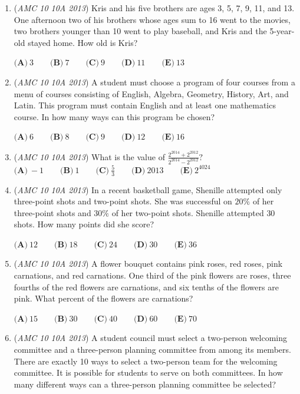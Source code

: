 \begin{enumerate}
 $\textbf{(A)}\ 15\qquad\textbf{(B)}\ 20\qquad\textbf{(C)}\ 25\qquad\textbf{(D)}\ 30\qquad\textbf{(E)}\ 35$


	\item (\textit{AMC 10 10A 2013}) Kris and his five brothers are ages 3, 5, 7, 9, 11, and 13.  One afternoon two of his brothers whose ages sum to 16 went to the movies, two brothers younger than 10 went to play baseball, and Kris and the 5-year-old stayed home.  How old is Kris?


 $\textbf{(A)}\ 3 \qquad\textbf{(B)}\ 7  \qquad\textbf{(C)}\ 9 \qquad\textbf{(D)}\ 11 \qquad\textbf{(E)}\ 13$


	\item (\textit{AMC 10 10A 2013}) A student must choose a program of four courses from a menu of courses consisting of English, Algebra, Geometry, History, Art, and Latin. This program must contain English and at least one mathematics course. In how many ways can this program be chosen?


 $\textbf{(A)}\ 6\qquad\textbf{(B)}\ 8\qquad\textbf{(C)}\ 9\qquad\textbf{(D)}\ 12\qquad\textbf{(E)}\ 16$


	\item (\textit{AMC 10 10A 2013}) What is the value of $\frac{2^{2014}+2^{2012}}{2^{2014}-2^{2012}} ?$
$\textbf{(A)}\ -1 \qquad\textbf{(B)}\ 1  \qquad\textbf{(C)}\ \frac{5}{3} \qquad\textbf{(D)}\ 2013 \qquad\textbf{(E)}\ 2^{4024}$


	\item (\textit{AMC 10 10A 2013}) In a recent basketball game, Shenille attempted only three-point shots and two-point shots.  She was successful on $20\%$ of her three-point shots and $30\%$ of her two-point shots.  Shenille attempted $30$ shots.  How many points did she score?


 $\textbf{(A)}\ 12 \qquad\textbf{(B)}\ 18  \qquad\textbf{(C)}\ 24 \qquad\textbf{(D)}\ 30 \qquad\textbf{(E)}\ 36$


	\item (\textit{AMC 10 10A 2013}) A flower bouquet contains pink roses, red roses, pink carnations, and red carnations.  One third of the pink flowers are roses, three fourths of the red flowers are carnations, and six tenths of the flowers are pink.  What percent of the flowers are carnations?


 $\textbf{(A)}\ 15 \qquad\textbf{(B)}\ 30  \qquad\textbf{(C)}\ 40 \qquad\textbf{(D)}\ 60 \qquad\textbf{(E)}\ 70$


	\item (\textit{AMC 10 10A 2013}) A student council must select a two-person welcoming committee and a three-person planning committee from among its members. There are exactly 10 ways to select a two-person team for the welcoming committee. It is possible for students to serve on both committees. In how many different ways can a three-person planning committee be selected?



\end{enumerate}

